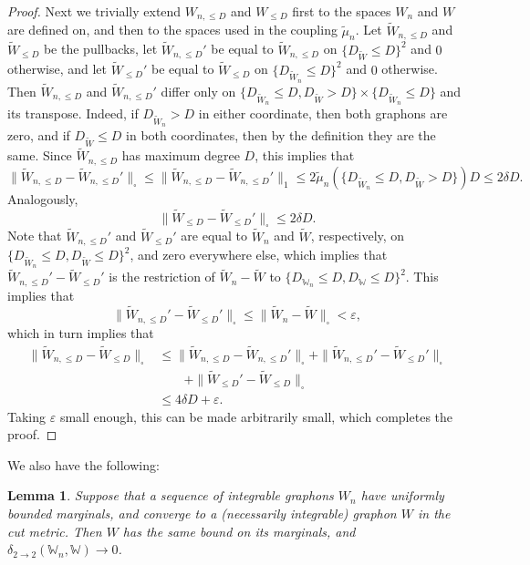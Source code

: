 \documentclass{amsart}
\numberwithin{equation}{section}
\numberwithin{figure}{section}
\newtheorem{lemma}[theorem]{Lemma}
\theoremstyle{definition}
\theoremstyle{remark}
\newcommand{\wmu}{\widetilde{\mu}}
\newcommand{\cW}{\mathbb{W}}
\newcommand{\wW}{\widetilde{W}}
\newcommand{\deltt}{\delta_{2\to 2}}
\begin{document}
\begin{proof}
Next we trivially extend $W_{n,\le D}$ and $W_{\le D}$ first to the spaces
$W_n$ and $W$ are defined on, and then to the spaces used in the coupling
$\wmu_n$. Let $\wW_{n,\le D}$ and $\wW_{\le D}$ be the pullbacks, let
$\wW_{n,\le D}'$ be equal to $\wW_{n,\le D}$ on $\{D_{\wW} \le D \}^2$ and
$0$ otherwise, and let $\wW_{\le D}'$ be equal to $\wW_{\le D}$ on
$\{D_{\wW_n} \le D \}^2$ and $0$ otherwise. Then $\wW_{n,\le D}$ and
$\wW_{n,\le D}'$ differ only on $\{D_{\wW_n}\le D,D_{\wW} > D\}
\times\{D_{\wW_n} \le D\}$ and its transpose. Indeed, if $D_{\wW_n} > D$ in
either coordinate, then both graphons are zero, and if $D_{\wW} \le D$ in
both coordinates, then by the definition they are the same. Since $\wW_{n,\le
D}$ has maximum degree $D$, this implies that
\[
\|\wW_{n,\le D}-\wW_{n,\le D}'\|_\square \le \|\wW_{n,\le D}-\wW_{n,\le D}'\|_1 \le 2\wmu_n(\{D_{\wW_n}\le D,D_{\wW} > D\})D \le 2\delta D.
\]
Analogously,
\[
\|\wW_{\le D}-\wW_{\le D}'\|_\square \le 2\delta D.
\]
Note that $\wW_{n,\le D}'$ and $\wW_{\le D}'$ are equal to $\wW_n$ and $\wW$,
respectively, on $\{D_{{\wW_n}} \le D,D_{{\wW}}\le D\}^2$, and zero
everywhere else, which implies that $\wW_{n,\le D}'-\wW_{\le D}'$ is the
restriction of $\wW_n-\wW$ to $\{D_{\cW_n} \le D,D_{\cW}\le D\}^2$. This
implies that
\[
\|\wW_{n,\le D}'-\wW_{\le D}'\|_\square
\le \|\wW_n-\wW\|_\square < \varepsilon,
\]
which in turn implies that
\begin{align*}
\|\wW_{n,\le D}-\wW_{\le D}\|_\square
&\le \|\wW_{n,\le D}-\wW_{n,\le D}'\|_\square
+\|\wW_{n,\le D}'-\wW_{\le D}'\|_\square\\
& \qquad
\phantom{}+\|\wW_{\le D}'-\wW_{\le D}\|_\square\\
&\le 4\delta D + \varepsilon.
\end{align*}
Taking $\varepsilon$ small enough, this can be made arbitrarily small, which
completes the proof.
\end{proof}

We also have the following:

\begin{lemma} \label{lemmaboundedcutmetricimplieskernelmetric}
Suppose that a sequence of integrable graphons $W_n$ have uniformly bounded
marginals, and converge to a (necessarily integrable) graphon $W$ in the cut
metric. Then $W$ has the same bound on its marginals, and $\deltt(\cW_n,\cW)
\to 0$.
\end{lemma}
\end{document}
